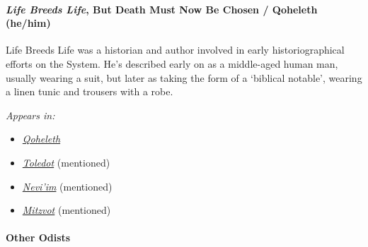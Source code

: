\paragraph{\texorpdfstring{\emph{Life Breeds Life}, But Death Must Now Be Chosen{ / Qoheleth} (he/him)}{Life Breeds Life, But Death Must Now Be Chosen / Qoheleth (he/him)}}

Life Breeds Life was a historian and author involved in early historiographical efforts on the System. He's described early on as a middle-aged human man, usually wearing a suit, but later {as taking the form of a `biblical notable', wearing a linen tunic and trousers with a robe.}

\emph{Appears in:}

\begin{itemize}
\tightlist
\item
  \href{https://qoheleth.post-self.ink}{\emph{Qoheleth}}
\item
  \href{https://toledot.post-self.ink}{\emph{Toledot}} (mentioned)
\item
  \href{https://neviim.post-self.ink}{\emph{Nevi'im}} (mentioned)
\item
  \href{https://mitzvot.post-self.ink}{\emph{Mitzvot}} (mentioned)
\end{itemize}

\paragraph{Other Odists}

